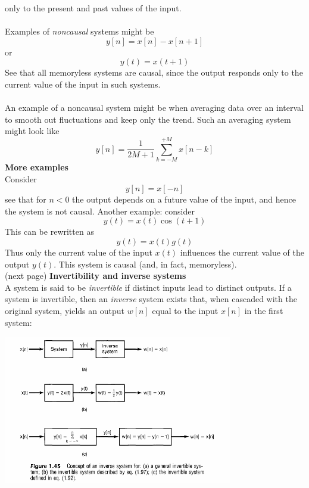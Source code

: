 \documentclass{report}
\begin{document}
only to the present and past values of the input.\\
\vspace{1mm}\\
Examples of \textit{noncausal} systems might be
\begin{equation*}
y[n]=x[n]-x[n+1]
\end{equation*}
or
\begin{equation*}
y(t)=x(t+1)
\end{equation*}
See that all memoryless systems are causal, since the output responds only to the current value of the input in such systems.\\
\vspace{1mm}\\
An example of a noncausal system might be when averaging data over an interval to smooth out fluctuations and keep only the trend.
Such an averaging system might look like
\begin{equation*}
y[n]=\frac{1}{2M+1}\sum^{+M}_{k=-M}x[n-k]
\end{equation*}
\textbf{More examples}\\
Consider
\begin{equation*}
y[n]=x[-n]
\end{equation*}
see that for $n<0$ the output depends on a future value of the input, and hence the system is not causal. Another example: consider
\begin{equation*}
y(t)=x(t)\cos(t+1)
\end{equation*}
This can be rewritten as 
\begin{equation*}
y(t)=x(t)g(t)
\end{equation*}
Thus only the current value of the input $x(t)$ influences the current value of the output $y(t)$. This system is causal (and,
in fact, memoryless).\\
(next page)\newpage
\noindent\textbf{Invertibility and inverse systems}\\
A system is said to be \textit{invertible} if distinct inputs lead to distinct outputs. If a system is invertible, then an
\textit{inverse} system exists that, when cascaded with the original system, yields an output $w[n]$ equal to the input
$x[n]$ in the first system:
\begin{center}
\includegraphics[width=10cm]{a13}
\end{center}
\end{document}
